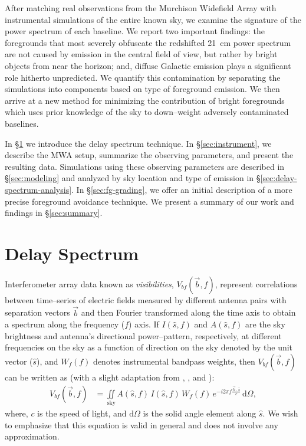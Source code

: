\documentclass[preprint2,iop,numberedappendix]{emulateapj}
\newcommand{\dif}{\mathrm{d}}
\begin{document}
After matching real observations from the Murchison Widefield Array with instrumental simulations of the entire known sky, we examine the signature of the power spectrum of each baseline. We report two important findings: the foregrounds that most severely obfuscate the redshifted 21~cm power spectrum are not caused by emission in the central field of view, but rather by bright objects from near the horizon; and, diffuse Galactic emission plays a significant role hitherto unpredicted. %
We quantify this contamination by separating the simulations into components based on type of foreground emission. We then arrive at a new method for minimizing the contribution of bright foregrounds which uses prior knowledge of the sky to down--weight adversely contaminated baselines.

In \S\ref{sec:delay-spectrum} we introduce the delay spectrum technique. In \S\ref{sec:instrument}, we describe the MWA setup, summarize the observing parameters, and present the resulting data. Simulations using these observing parameters are described in \S\ref{sec:modeling} and analyzed by sky location and type of emission in \S\ref{sec:delay-spectrum-analysis}. In \S\ref{sec:fg-grading}, we offer an initial description of a more precise foreground avoidance technique. We present a summary of our work and findings in \S\ref{sec:summary}.

\section{Delay Spectrum}\label{sec:delay-spectrum}

Interferometer array data known as {\it visibilities}, $V_{bf}(\vec{b},f)$, represent correlations between time--series of electric fields measured by different antenna pairs with separation vectors $\vec{b}$ and then Fourier transformed along the time axis to obtain a spectrum along the frequency ($f$) axis. If $I(\hat{s},f)$ and $A(\hat{s},f)$ are the sky brightness and antenna's directional power--pattern, respectively, at different frequencies on the sky as a function of direction on the sky denoted by the unit vector ($\hat{s}$), and $W_f(f)$ denotes instrumental bandpass weights, then $V_{bf}(\vec{b},f)$ can be written as (with a slight adaptation from \citet{van34}, \citet{zer38}, and \citet{tho01}):
\begin{align}\label{eqn:obsvis}
  V_{bf}(\vec{b},f) &= \iint\limits_\textrm{sky} A(\hat{s},f)\,I(\hat{s},f)\,W_f(f)\,e^{-i2\pi f\frac{\vec{b}\cdot\hat{s}}{c}}\,\dif\Omega,
\end{align}
where, $c$ is the speed of light, and $\dif\Omega$ is the solid angle element along $\hat{s}$. We wish to emphasize that this equation is valid in general and does not involve any approximation.
\end{document}
